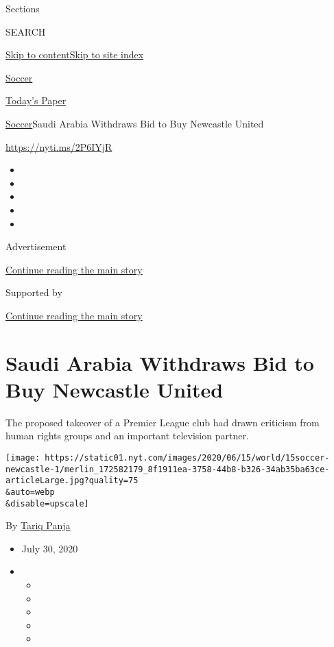Sections

SEARCH

\protect\hyperlink{site-content}{Skip to
content}\protect\hyperlink{site-index}{Skip to site index}

\href{https://www.nytimes.com/section/sports/soccer}{Soccer}

\href{https://myaccount.nytimes.com/auth/login?response_type=cookie\&client_id=vi}{}

\href{https://www.nytimes.com/section/todayspaper}{Today's Paper}

\href{/section/sports/soccer}{Soccer}\textbar{}Saudi Arabia Withdraws
Bid to Buy Newcastle United

\url{https://nyti.ms/2P6IYjR}

\begin{itemize}
\item
\item
\item
\item
\item
\end{itemize}

Advertisement

\protect\hyperlink{after-top}{Continue reading the main story}

Supported by

\protect\hyperlink{after-sponsor}{Continue reading the main story}

\hypertarget{saudi-arabia-withdraws-bid-to-buy-newcastle-united}{%
\section{Saudi Arabia Withdraws Bid to Buy Newcastle
United}\label{saudi-arabia-withdraws-bid-to-buy-newcastle-united}}

The proposed takeover of a Premier League club had drawn criticism from
human rights groups and an important television partner.

\texttt{[image: https://static01.nyt.com/images/2020/06/15/world/15soccer-newcastle-1/merlin\_172582179\_8f1911ea-3758-44b8-b326-34ab35ba63ce-articleLarge.jpg?quality=75\\\&auto=webp\\\&disable=upscale]}

By \href{https://www.nytimes.com/by/tariq-panja}{Tariq Panja}

\begin{itemize}
\item
  July 30, 2020
\item
  \begin{itemize}
  \item
  \item
  \item
  \item
  \item
  \end{itemize}
\end{itemize}

